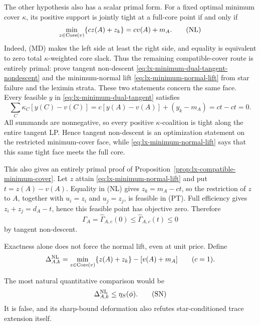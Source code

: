 The other hypothesis also has a scalar primal form.  For a fixed optimal
minimum cover $\kappa$, its positive support is jointly tight at a full-core
point if and only if
\[
 \min_{z\in\operatorname{Core}(v)}\{c z(A)+z_k\}=c v(A)+m_A.       \tag{NL}
 \label{eq:lx-minimum-normal-lift}
\]
Indeed, (MD) makes the left side at least the right side, and equality is
equivalent to zero total $\kappa$-weighted core slack.  Thus the remaining
compatible-cover route is entirely primal: prove tangent non-descent
\eqref{eq:lx-minimum-dual-tangent-nondescent} and the minimum-normal lift
\eqref{eq:lx-minimum-normal-lift} from star failure and the leximin strata.
These two statements concern the same face.  Every feasible $y$ in
\eqref{eq:lx-minimum-dual-tangent} satisfies
\[
 \sum_C\kappa_C[y(C)-v(C)]
 =c[y(A)-v(A)]+(y_k-m_A)=ct-ct=0.
 \tag{MF}\label{eq:lx-minimum-cover-face}
\]
All summands are nonnegative, so every positive $\kappa$-coalition is tight
along the entire tangent LP.  Hence tangent non-descent is an optimization
statement on the restricted minimum-cover face, while
\eqref{eq:lx-minimum-normal-lift} says that this same tight face meets the full
core.

This also gives an entirely primal proof of
Proposition~\ref{prop:lx-compatible-minimum-cover}.  Let $z$ attain
\eqref{eq:lx-minimum-normal-lift} and put $t=z(A)-v(A)$.  Equality in (NL)
gives $z_k=m_A-ct$, so the restriction of $z$ to $A$, together with
$u_i=z_i$ and $u_j=z_j$, is feasible in (PT).  Full efficiency gives
$z_i+z_j=d_A-t$, hence this feasible point has objective zero.  Therefore
\[
 \Gamma_A=\widehat\Gamma_{A,c}(0)
 \leq\widehat\Gamma_{A,c}(t)\leq0
\]
by tangent non-descent.

Exactness alone does not force the normal lift, even at unit price.  Define
\[
 \Delta^{\rm NL}_{A,k}
 =\min_{z\in\operatorname{Core}(v)}\{z(A)+z_k\}-[v(A)+m_A]
 \qquad(c=1).
\]

The most natural quantitative comparison would be
\[
 \Delta^{\rm NL}_{A,k}\leq\eta_S(\phi).
 \tag{SN}\label{eq:lx-star-to-normal}
\]
It is false, and its sharp-bound deformation also refutes star-conditioned
trace extension itself.

